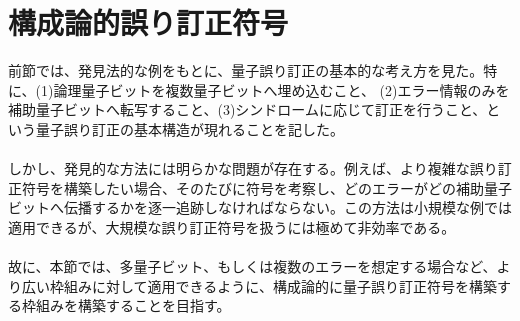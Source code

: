 \documentclass[a4paper,10.5pt]{article}
\numberwithin{equation}{section}
\begin{document}
\section{構成論的誤り訂正符号}
前節では、発見法的な例をもとに、量子誤り訂正の基本的な考え方を見た。特に、(1)論理量子ビットを複数量子ビットへ埋め込むこと、
(2)エラー情報のみを補助量子ビットへ転写すること、(3)シンドロームに応じて訂正を行うこと、という量子誤り訂正の基本構造が現れることを記した。\\
\\
しかし、発見的な方法には明らかな問題が存在する。例えば、より複雑な誤り訂正符号を構築したい場合、そのたびに符号を考察し、どのエラーがどの補助量子ビットへ伝播するかを逐一追跡しなければならない。この方法は小規模な例では適用できるが、大規模な誤り訂正符号を扱うには極めて非効率である。\\
\\
故に、本節では、多量子ビット、もしくは複数のエラーを想定する場合など、より広い枠組みに対して適用できるように、構成論的に量子誤り訂正符号を構築する枠組みを構築することを目指す。
\end{document}
